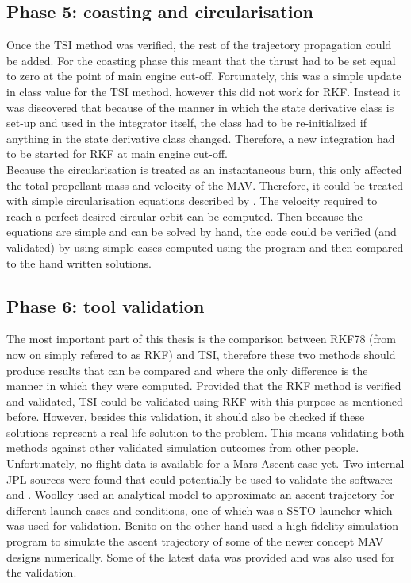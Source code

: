 \subsection{Phase 5: coasting and circularisation}
\label{subsec:phase5com}
Once the \ac{TSI} method was verified, the rest of the trajectory propagation could be added. For the coasting phase this meant that the thrust had to be set equal to zero at the point of main engine cut-off. Fortunately, this was a simple update in class value for the \ac{TSI} method, however this did not work for \ac{RKF}. Instead it was discovered that because of the manner in which the state derivative class is set-up and used in the integrator itself, the class had to be re-initialized if anything in the state derivative class changed. Therefore, a new integration had to be started for \ac{RKF} at main engine cut-off. \\

\noindent
Because the circularisation is treated as an instantaneous burn, this only affected the total propellant mass and velocity of the \ac{MAV}. Therefore, it could be treated with simple circularisation equations described by \cite{wakker2010}. The velocity required to reach a perfect desired circular orbit can be computed. Then because the equations are simple and can be solved by hand, the code could be verified (and validated) by using simple cases computed using the program and then compared to the hand written solutions. 

\subsection{Phase 6: tool validation}
\label{subsec:phase6com}
The most important part of this thesis is the comparison between \ac{RKF78} (from now on simply refered to as \ac{RKF}) and \ac{TSI}, therefore these two methods should produce results that can be compared and where the only difference is the manner in which they were computed. Provided that the \ac{RKF} method is verified and validated, \ac{TSI} could be validated using \ac{RKF} with this purpose as mentioned before. However, besides this validation, it should also be checked if these solutions represent a real-life solution to the problem. This means validating both methods against other validated simulation outcomes from other people. Unfortunately, no flight data is available for a Mars Ascent case yet. Two internal \ac{JPL} sources were found that could potentially be used to validate the software: \cite{woolley2015simple} and \cite{benito2016trajectory}. Woolley used an analytical model to approximate an ascent trajectory for different launch cases and conditions, one of which was a \ac{SSTO} launcher which was used for validation. Benito on the other hand used a high-fidelity simulation program to simulate the ascent trajectory of some of the newer concept \ac{MAV} designs numerically. Some of the latest data was provided and was also used for the validation.\\

